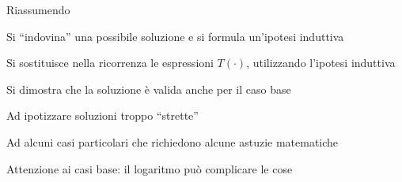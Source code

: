 \begin{frame}{Riassumendo}
	
\vspace{-6pt}
\begin{myboxtitle}
\BI
\item Si “\alert{indovina}” una possibile soluzione e si formula un'ipotesi induttiva
\item Si \alert{sostituisce} nella ricorrenza
  le espressioni $T(\cdot)$, utilizzando l'ipotesi induttiva
\item Si \alert{dimostra} che la soluzione è valida anche per il caso base
\EI
\end{myboxtitle}

\begin{myboxtitle}[Attenzione]
\BI
\item Ad ipotizzare soluzioni troppo “strette”
\item Ad alcuni casi particolari che
richiedono alcune astuzie matematiche
\item Attenzione ai casi base: il logaritmo può complicare le cose
\EI
\end{myboxtitle}
\end{frame}

